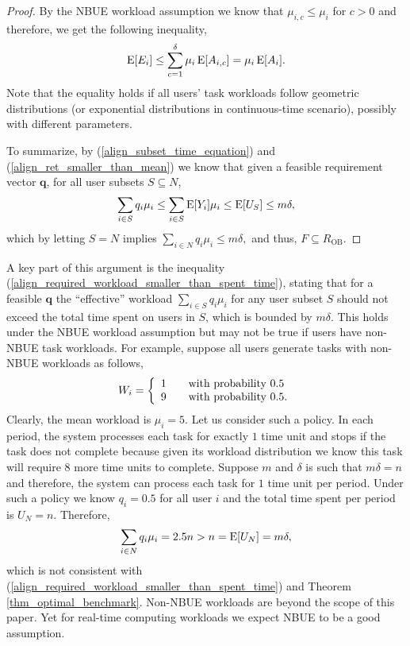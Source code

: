 \documentclass[prodmode,acmtompecs]{acmsmall}
\newcommand{\reqvec}{\mathbf{q}}
\newcommand{\reqscalar}{q}
\newcommand{\fullUserSet}{N}
\newcommand{\myComments}[1]{}
\newcommand{\commentEnd}{\myComments{End}}
\begin{document}
\begin{proof}
By the NBUE workload assumption we know that $\mu_{i, c} \leq \mu_i$ for $c > 0$ and therefore, we get the following inequality,
\begin{align}
\label{align_ret_smaller_than_mean}
\operatorname*{\mathrm{E}}[E_i] \leq \sum\limits_{c=1}^{\delta} \mu_i \operatorname*{\mathrm{E}}[A_{i, c}] = \mu_i \operatorname*{\mathrm{E}}[A_i]. 
\end{align}
Note that the equality holds if all users' task workloads follow geometric distributions (or exponential distributions in continuous-time scenario), possibly with different parameters. 

To summarize, by (\ref{align_subset_time_equation}) and (\ref{align_ret_smaller_than_mean}) we know that given a feasible requirement vector $\reqvec$, for all user subsets $S\subseteq \fullUserSet$,
\begin{align}
\label{align_required_workload_smaller_than_spent_time}
\sum\limits_{i\in S} \reqscalar_i \mu_i \leq \sum\limits_{i\in S} \expectation[Y_i] \mu_i \leq \expectation[U_S] \leq m\delta, 
\end{align}
which by letting $S = \fullUserSet$ implies
$
\sum\limits_{i\in \fullUserSet} \reqscalar_i \mu_i \leq m\delta, 
$
and thus, 
$
F \subseteq R_{\text{OB}}. 
$
\end{proof}

A key part of this argument is the inequality (\ref{align_required_workload_smaller_than_spent_time}), stating that for a feasible $\reqvec$ the ``effective'' workload $\sum\limits_{i\in S} \reqscalar_i \mu_i$ for any user subset $S$ should not exceed the total time spent on users in $S$, which is bounded by $m\delta$. 
This holds under the NBUE workload assumption but may not be true if users have non-NBUE task workloads. For example, suppose all users generate tasks with non-NBUE workloads as follows, 
$$
W_i = \left\{ 
   \begin{array}{l l}
     1 & \quad \text{with probability $0.5$}	\\
     9 & \quad \text{with probability $0.5$}. 	\\
   \end{array} \right.
$$
Clearly, the mean workload is $\mu_i = 5$. 
Let us consider such a policy. In each period, the system processes each task for exactly $1$ time unit and stops if the task does not complete because given its workload distribution we know this task will require $8$ more time units to complete. Suppose $m$ and $\delta$ is such that $m\delta = n$ and therefore, the system can process each task for $1$ time unit per period. Under such a policy we know $\reqscalar_i = 0.5$ for all user $i$ and the total time spent per period is $U_{\fullUserSet} = n$. Therefore, 
\begin{align*}
\sum\limits_{i\in \fullUserSet} \reqscalar_i\mu_i = 2.5n > n = \expectation[U_{\fullUserSet}] = m\delta, 
\end{align*}
which is not consistent with (\ref{align_required_workload_smaller_than_spent_time}) and Theorem \ref{thm_optimal_benchmark}. 
Non-NBUE workloads are beyond the scope of this paper. Yet for real-time computing workloads we expect NBUE to be a good assumption. 
\commentEnd\fi
\end{document}
